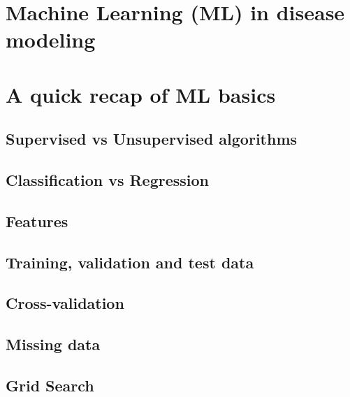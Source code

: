 \documentclass[handout, c, 11pt, xcolor=svgnames, hyperref={colorlinks,citecolor=DeepPink4,linkcolor=DarkRed,urlcolor=DarkBlue}]{beamer} %
\begin{document}
\section{Machine Learning (ML) in disease modeling}


\begin{frame}
	
	
\end{frame}


\section{A quick recap of ML basics}

\subsection{Supervised vs Unsupervised algorithms}

\subsection{Classification vs Regression}

\subsection{Features}


\subsection{Training, validation and test data}

\subsection{Cross-validation}

\subsection{Missing data}

\subsection{Grid Search}
\end{document}
